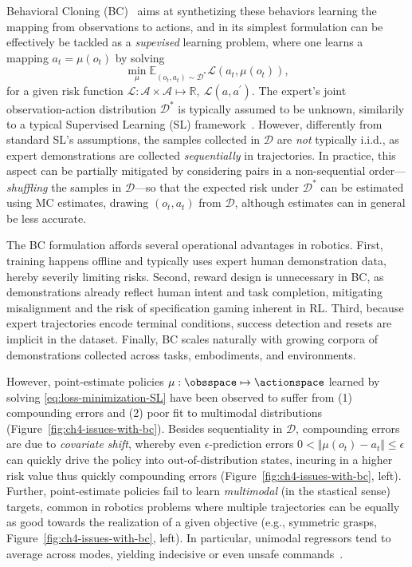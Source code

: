 Behavioral Cloning (BC)~\citep{pomerleauALVINNAutonomousLand1988a} aims at synthetizing these behaviors learning the mapping from observations to actions, and in its simplest formulation can be effectively be tackled as a \emph{supevised} learning problem, where one learns a mapping \( a_t = \mu(o_t) \) by solving
\begin{equation}\label{eq:loss-minimization-SL}
    \min_{\mu} \mathbb{E}_{(o_t, a_t) \sim \mathcal{D}^*} \mathcal L(a_t, \mu(o_t)),
\end{equation}
for a given risk function \( \mathcal L:  \mathcal A \times \mathcal A \mapsto \mathbb{R}, \ \mathcal L (a, a^\prime) \).
The expert's joint observation-action distribution \( \mathcal D^* \) is typically assumed to be unknown, similarily to a typical Supervised Learning (SL) framework~\citep{shalev-shwartzUnderstandingMachineLearning2014}.
However, differently from standard SL's assumptions, the samples collected in \( \mathcal D \) are \emph{not} typically i.i.d., as expert demonstrations are collected \emph{sequentially} in trajectories.
In practice, this aspect can be partially mitigated by considering pairs in a non-sequential order---\emph{shuffling} the samples in \(\mathcal D \)---so that the expected risk under \( \mathcal D^* \) can be estimated using MC estimates, drawing \((o_t, a_t)\) from \( \mathcal D \), although estimates can in general be less accurate.

The BC formulation affords several operational advantages in robotics.
First, training happens offline and typically uses expert human demonstration data, hereby severily limiting risks.
Second, reward design is unnecessary in BC, as demonstrations already reflect human intent and task completion, mitigating misalignment and the risk of specification gaming inherent in RL.
Third, because expert trajectories encode terminal conditions, success detection and resets are implicit in the dataset.
Finally, BC scales naturally with growing corpora of demonstrations collected across tasks, embodiments, and environments.

However, point-estimate policies \( \mu : \obsspace \mapsto \actionspace \) learned by solving \ref{eq:loss-minimization-SL} have been observed to suffer from (1) compounding errors and (2) poor fit to multimodal distributions~\citep{florenceImplicitBehavioralCloning2022, keGraspingChopsticksCombating2020} (Figure~\ref{fig:ch4-issues-with-bc}).
Besides sequentiality in \( \mathcal D \), compounding errors are due to \emph{covariate shift}, whereby even \( \epsilon \)-prediction errors \( 0 < \Vert \mu(o_t) - a_t \Vert \leq \epsilon \) can quickly drive the policy into out-of-distribution states, incuring in a higher risk value thus quickly compounding errors (Figure~\ref{fig:ch4-issues-with-bc}, left).
Further, point-estimate policies fail to learn \emph{multimodal} (in the stastical sense) targets, common in robotics problems where multiple trajectories can be equally as good towards the realization of a given objective (e.g.,  symmetric grasps, Figure~\ref{fig:ch4-issues-with-bc}, left). 
In particular, unimodal regressors tend to average across modes, yielding indecisive or even unsafe commands~\citep{florenceImplicitBehavioralCloning2022}.

